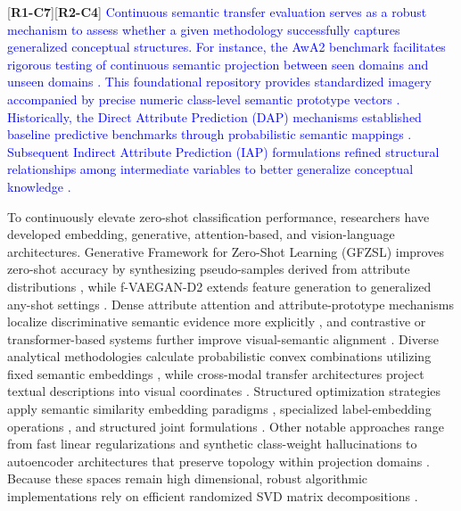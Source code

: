 \documentclass[make,article,submit,pdftex,moreauthors]{Definitions/mdpi}
\newcommand{\revtag}[2]{[\textbf{R#1-C#2}]}
\newcommand{\Rone}[1]{\textcolor{red}{#1}}
\newcommand{\Rtwo}[1]{\textcolor{blue}{#1}}
\begin{document}
\revtag{1}{7}\revtag{2}{4} \Rone{\Rtwo{Continuous semantic transfer evaluation serves as a robust mechanism to assess whether a given methodology successfully captures generalized conceptual structures. For instance, the AwA2 benchmark facilitates rigorous testing of continuous semantic projection between seen domains and unseen domains \cite{Xian2019AwA2}. This foundational repository provides standardized imagery accompanied by precise numeric class-level semantic prototype vectors \cite{AwA2Website}. Historically, the Direct Attribute Prediction (DAP) mechanisms established baseline predictive benchmarks through probabilistic semantic mappings \cite{Lampert2009Attribute}. Subsequent Indirect Attribute Prediction (IAP) formulations refined structural relationships among intermediate variables to better generalize conceptual knowledge \cite{Lampert2014Attribute}.}} 

To continuously elevate zero-shot classification performance, researchers have developed embedding, generative, attention-based, and vision-language architectures. Generative Framework for Zero-Shot Learning (GFZSL) improves zero-shot accuracy by synthesizing pseudo-samples derived from attribute distributions \cite{Verma2017GFZSL}, while f-VAEGAN-D2 extends feature generation to generalized any-shot settings \cite{Xian2019Fvaegan}. Dense attribute attention and attribute-prototype mechanisms localize discriminative semantic evidence more explicitly \cite{Huynh2020DAZLE,Xu2020APN}, and contrastive or transformer-based systems further improve visual-semantic alignment \cite{Han2021CEGZSL,Chen2022TransZero,Chen2023TransZeroPlus,Naeem2024I2DFormer}. Diverse analytical methodologies calculate probabilistic convex combinations utilizing fixed semantic embeddings \cite{Norouzi2014ConSE}, while cross-modal transfer architectures project textual descriptions into visual coordinates \cite{Socher2013CMT}. Structured optimization strategies apply semantic similarity embedding paradigms \cite{Zhang2015SSE}, specialized label-embedding operations \cite{Akata2016ALE}, and structured joint formulations \cite{Akata2015SJE}. Other notable approaches range from fast linear regularizations \cite{RomeraParedes2015ESZSL} and synthetic class-weight hallucinations \cite{Changpinyo2016SYNC} to autoencoder architectures that preserve topology within projection domains \cite{Kodirov2017SAE}. Because these spaces remain high dimensional, robust algorithmic implementations rely on efficient randomized SVD matrix decompositions \cite{Halko2011RandomizedSVD}.
\end{document}
